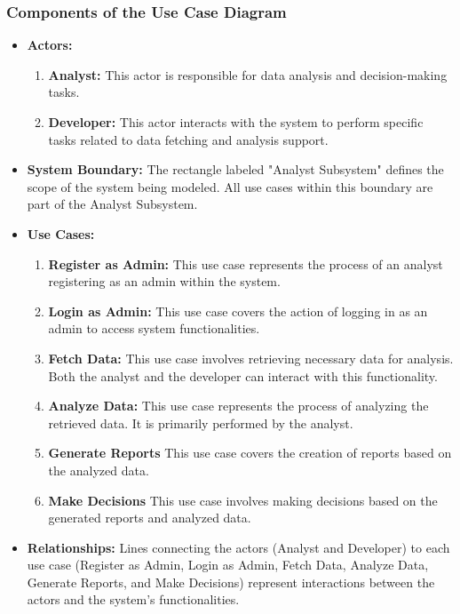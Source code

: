 \subsubsection{Components of the Use Case Diagram }
\begin{itemize}
    \item \textbf{Actors: }
    \begin{enumerate}
        \item \textbf{Analyst: }This actor is responsible for data analysis and decision-making tasks. 
        \item \textbf{Developer: }This actor interacts with the system to perform specific tasks related to data fetching and analysis support. 
    \end{enumerate}
    \item \textbf{System Boundary: }The rectangle labeled "Analyst Subsystem" defines the scope of the system being modeled. All use cases within this boundary are part of the Analyst Subsystem. 
    \item \textbf{Use Cases: }
    \begin{enumerate}
        \item \textbf{Register as Admin: }This use case represents the process of an analyst registering as an admin within the system. 
        \item \textbf{Login as Admin: }This use case covers the action of logging in as an admin to access system functionalities.   
        \item \textbf{Fetch Data: } This use case involves retrieving necessary data for analysis. Both the analyst and the developer can interact with this functionality. 
        \item  \textbf{Analyze Data: } This use case represents the process of analyzing the retrieved data. It is primarily performed by the analyst. 
        \item  \textbf{Generate Reports } This use case covers the creation of reports based on the analyzed data.  
        \item  \textbf{Make Decisions } This use case involves making decisions based on the generated reports and analyzed data.
    \end{enumerate}
    \item \textbf{Relationships: }Lines connecting the actors (Analyst and Developer) to each use case (Register as Admin, Login as Admin, Fetch Data, Analyze Data, Generate Reports, and Make Decisions) represent interactions between the actors and the system's functionalities. 
\end{itemize}

